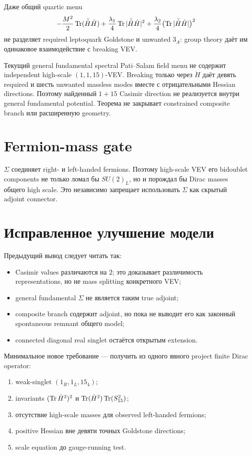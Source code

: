 Даже общий quartic menu
\begin{equation}
 -\frac{M^2}{2}\operatorname{Tr}(\bar{\dot H}\dot H)
 +\frac{\lambda_1}{4}\operatorname{Tr}|\bar{\dot H}\dot H|^2
 +\frac{\lambda_2}{4}\bigl(\operatorname{Tr}|\bar{\dot H}\dot H|\bigr)^2
\end{equation}
не разделяет required leptoquark Goldstone и unwanted \(3_A\): group theory
даёт им одинаковое взаимодействие с breaking VEV.

\begin{theorem}
Текущий general fundamental spectral Pati--Salam field menu не содержит
independent high-scale \((1,1,15)\)-VEV. Breaking только через \(\dot H\) даёт девять
required и шесть unwanted massless modes вместе с отрицательными Hessian
directions. Поэтому найденный \(1+15\) Casimir direction не реализуется
внутри general fundamental potential. Теорема не закрывает constrained
composite branch или расширенную geometry.
\end{theorem}

\section{Fermion-mass gate}

\(\Sigma\) соединяет right- и left-handed fermions. Поэтому high-scale VEV
его bidoublet components не только ломал бы \(SU(2)_L\), но и порождал бы
Dirac masses общего high scale. Это независимо запрещает использовать
\(\Sigma\) как скрытый adjoint connector.

\section{Исправленное улучшение модели}

Предыдущий вывод следует читать так:
\begin{itemize}
 \item Casimir values различаются на \(2\); это доказывает различимость
 representations, но не mass splitting конкретного VEV;
 \item general fundamental \(\Sigma\) не является таким true adjoint;
 \item composite branch содержит adjoint, но пока не выводит его как
 законный spontaneous remnant общего model;
 \item connected diagonal real singlet остаётся открытым extension.
\end{itemize}

Минимальное новое требование --- получить из одного явного project finite
Dirac operator:
\begin{enumerate}
 \item weak-singlet \((1_R,1_L,15_4)\);
 \item invariants \((\operatorname{Tr}\dot H^2)^2\) и
 \(\operatorname{Tr}(\dot H^2)\operatorname{Tr}(S_{15}^2)\);
 \item отсутствие high-scale masses для observed left-handed fermions;
 \item positive Hessian вне девяти точных Goldstone directions;
 \item scale equation до gauge-running test.
\end{enumerate}

